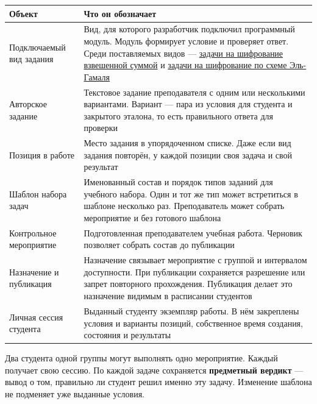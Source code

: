\documentclass[12pt,a4paper]{article}
\newcounter{none} %
\begin{document}
{\def\LTcaptype{none} %
\begin{longtable}[]{@{}
  >{\raggedright\arraybackslash}p{}
  >{\raggedright\arraybackslash}p{}@{}}
\toprule\noalign{}
\begin{minipage}[b]{\linewidth}\raggedright
Объект
\end{minipage} & \begin{minipage}[b]{\linewidth}\raggedright
Что он обозначает
\end{minipage} \\
\midrule\noalign{}
\endhead
\bottomrule\noalign{}
\endlastfoot
Подключаемый вид задания & Вид, для которого разработчик подключил программный модуль. Модуль формирует условие и проверяет ответ. Среди поставляемых видов --- {\hyperlink{doc-05-требования-к-ранцевым-задачам}{задачи на шифрование взвешенной суммой}} и {\hyperlink{sr-elg-001-условие-и-результат-задачи-эль-гамаля}{задачи на шифрование по схеме Эль-Гамаля}} \\
Авторское задание & Текстовое задание преподавателя с одним или несколькими вариантами. Вариант --- пара из условия для студента и закрытого эталона, то есть правильного ответа для проверки \\
Позиция в работе & Место задания в упорядоченном списке. Даже если вид задания повторён, у каждой позиции своя задача и свой результат \\
Шаблон набора задач & Именованный состав и порядок типов заданий для учебного набора. Один и тот же тип может встретиться в шаблоне несколько раз. Преподаватель может собрать мероприятие и без готового шаблона \\
Контрольное мероприятие & Подготовленная преподавателем учебная работа. Черновик позволяет собрать состав до публикации \\
Назначение и публикация & Назначение связывает мероприятие с группой и интервалом доступности. При публикации сохраняется разрешение или запрет повторного прохождения. Публикация делает это назначение видимым в расписании студентов \\
Личная сессия студента & Выданный студенту экземпляр работы. В нём закреплены условия и варианты позиций, собственное время создания, состояния и результаты \\
\end{longtable}
}

Два студента одной группы могут выполнять одно мероприятие. Каждый получает свою сессию. По каждой задаче сохраняется \textbf{предметный вердикт} --- вывод о том, правильно ли студент решил именно эту задачу. Изменение шаблона не подменяет уже выданные условия.
\end{document}
